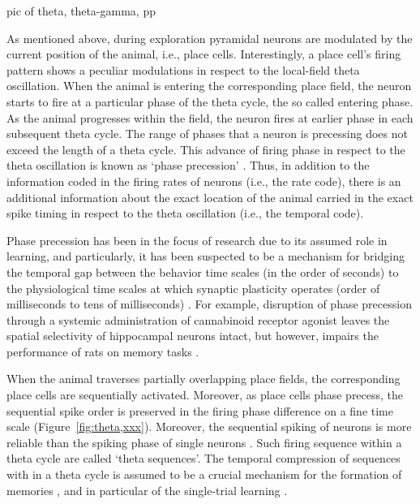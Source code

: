     pic of theta, theta-gamma, pp

    As mentioned above, during exploration pyramidal neurons are modulated by
    the current position of the animal, i.e., place cells. Interestingly, a
    place cell's firing pattern shows a peculiar modulations in respect to the
    local-field theta oscillation. When the animal is entering the
    corresponding place field, the neuron starts to fire at a particular phase
    of the theta cycle, the so called entering phase. As the animal progresses
    within the field, the neuron fires at earlier phase in each subsequent
    theta cycle. The range of phases that a neuron is precessing does not
    exceed the length of a theta cycle. This advance of firing phase in respect
    to the theta oscillation is known as `phase precession' \citep{OKeefe1993}.
    Thus, in addition to the information coded in the firing rates of neurons
    (i.e., the rate code), there is an additional information about the exact
    location of the animal carried in the exact spike timing in respect to the
    theta oscillation (i.e., the temporal code).
    
    Phase precession has been in the focus of research due to its assumed role
    in learning, and particularly, it has been suspected to be a mechanism for
    bridging the temporal gap between the behavior time scales (in the order of
    seconds) to the physiological time scales at which synaptic plasticity
    operates (order of milliseconds to tens of milliseconds) \citep{Bi1998}. For
    example, disruption of phase precession through a systemic administration
    of cannabinoid receptor agonist leaves the spatial selectivity of
    hippocampal neurons intact, but however, impairs the performance of rats on
    memory tasks \citep{Robbe2009}.
    
    When the animal traverses partially overlapping place fields, the
    corresponding place cells are sequentially activated. Moreover, as place
    cells phase precess, the sequential spike order is preserved in the firing phase
    difference on a fine time scale (Figure~\ref{fig:theta,xxx}). Moreover, the
    sequential spiking of neurons is more reliable than the spiking phase of
    single neurons \citep{Dragoi2006}.  Such firing sequence within a theta
    cycle are called `theta sequences'. The temporal compression of
    sequences with in a theta cycle is assumed to be a crucial mechanism for
    the formation of memories \cite{??}, and in particular of the single-trial
    learning \cite{Rutishauser2006}. 
    
